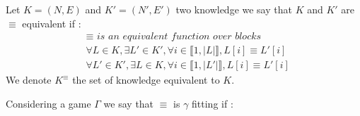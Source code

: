 \begin{mydef}
	Let $K = (N,E)$ and $K'=(N',E')$ two knowledge we say that $K$ and $K'$ are $\equiv$ equivalent if :
	\begin{eqnarray*}
		& \equiv \textit{ is an equivalent function over blocks}  \\
		& \forall L \in K, \exists L' \in K', \forall i \in \llbracket 1,|L| \rrbracket, L[i] \equiv L'[i] \\
		& \forall L' \in K', \exists L \in K, \forall i \in \llbracket 1,|L'| \rrbracket, L[i] \equiv L'[i] 
	\end{eqnarray*}	
	We denote $K^{\equiv}$ the set of knowledge equivalent to $K$. 
\end{mydef}

\begin{mydef}
	Considering a game $\Gamma$ we say that $\equiv$ is $\gamma$ fitting if :
\end{mydef}
